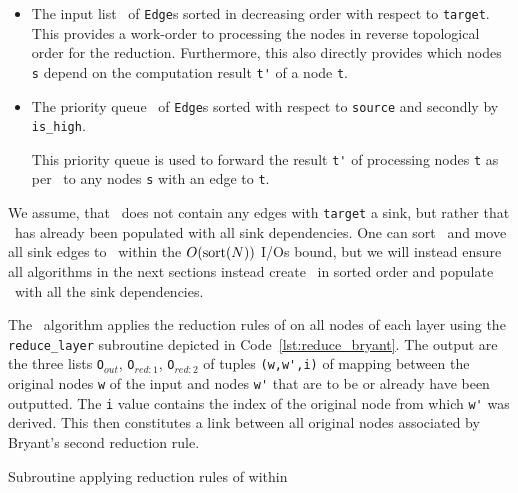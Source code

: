\begin{itemize}
\item The input list \ReduceLforward\ of \lstinline{Edge}s sorted in decreasing
  order with respect to \lstinline{target}. This provides a work-order to
  processing the nodes in reverse topological order for the reduction.
  Furthermore, this also directly provides which nodes \lstinline{s} depend on
  the computation result \lstinline{t'} of a node \lstinline{t}.

\item The priority queue \ReduceQdep\ of \lstinline{Edge}s sorted with
  respect to \lstinline{source} and secondly by \lstinline{is_high}.

  This priority queue is used to forward the result \lstinline{t'} of processing
  nodes \lstinline{t} as per \ReduceLforward\ to any nodes \lstinline{s} with an
  edge to \lstinline{t}.
\end{itemize}
We assume, that \ReduceLforward\ does not contain any edges with \lstinline{target}
a sink, but rather that \ReduceQdep\ has already been populated with all sink
dependencies. One can sort \ReduceLforward\ and move all sink edges to
\ReduceQdep\ within the $O(\text{sort}(N))$ I/Os bound, but we will instead ensure all
algorithms in the next sections instead create \ReduceLforward\ in sorted order
and populate \ReduceQdep\ with all the sink dependencies.

The \Reduce\ algorithm applies the reduction rules of \textcite[Definition
5]{Bryant86} on all nodes of each layer using the \lstinline{reduce_layer}
subroutine depicted in Code~\ref{lst:reduce_bryant}. The output are the three
lists \lstinline{O}$_{\mathit{out}}$, \lstinline{O}$_{\mathit{red:}1}$,
\lstinline{O}$_{\mathit{red:}2}$ of tuples \lstinline{(w,w',i)} of mapping
between the original nodes \lstinline{w} of the input and nodes \lstinline{w'}
that are to be or already have been outputted. The \lstinline{i} value contains
the index of the original node from which \lstinline{w'} was derived. This then
constitutes a link between all original nodes associated by Bryant's second
reduction rule.

\begin{lstfloat}[ht!]
  \centering

  

  \caption{Subroutine applying reduction rules of \cite{Bryant86} within \Reduce}
  \label{lst:reduce_bryant}
\end{lstfloat}

